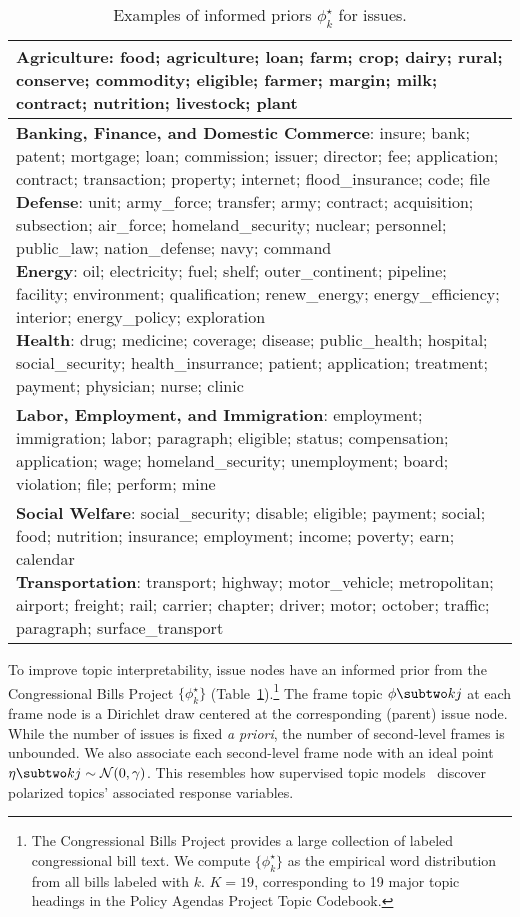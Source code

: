 \begin{table}[t!]
\centering \small
\begin{tabular}{p{.95\linewidth}}
  \hline
  \textbf{{Agriculture}}:
    food; agriculture; loan; farm; crop; dairy; rural; conserve; commodity; eligible; farmer; margin; milk; contract; nutrition; livestock; plant \\ \hline
\ignore{
  \textbf{{Banking, Finance, and Domestic Commerce}}:
    insure; bank; patent; mortgage; loan; commission; issuer; director; fee; application; contract; transaction; property; internet; flood\_insurance; code; file\\ \hline
  \textbf{{Defense}}:
    unit; army\_force; transfer; army; contract; acquisition; subsection; air\_force; homeland\_security; nuclear; personnel; public\_law; nation\_defense; navy; command \\ \hline
  \textbf{{Energy}}:
    oil; electricity; fuel; shelf; outer\_continent; pipeline; facility; environment; qualification; renew\_energy; energy\_efficiency; interior; energy\_policy; exploration \\ \hline}
  \textbf{{Health}}:
    drug; medicine; coverage; disease; public\_health; hospital; social\_security; health\_insurrance; patient; application; treatment; payment; physician; nurse; clinic\\ \hline
  \textbf{{Labor, Employment, and Immigration}}:
    employment; immigration; labor; paragraph; eligible; status; compensation; application; wage; homeland\_security; unemployment; board; violation; file; perform; mine \\ \hline
\ignore{  \textbf{{Social Welfare}}:
    social\_security; disable; eligible; payment; social; food; nutrition; insurance; employment; income; poverty; earn;  calendar \\ \hline
  \textbf{{Transportation}}:
    transport; highway; motor\_vehicle; metropolitan; airport; freight; rail; carrier; chapter; driver; motor; october; traffic; paragraph; surface\_transport \\ \hline}
\end{tabular}
\caption{Examples of informed priors $\phi_k^{\star}$ for issues.}
\label{tab:c6_prior}
\end{table}

To improve topic interpretability, issue nodes have an informed prior
from the Congressional Bills Project $\{\phi_k^{\star}\}$
(Table~\ref{tab:c6_prior}).\footnote{The Congressional Bills Project
  provides a large collection of labeled congressional bill text.  We
  compute $\{\phi_k^{\star}\}$ as the empirical word distribution from
  all bills labeled with $k$. $K=19$, corresponding to 19 major topic
  headings in the Policy Agendas Project Topic Codebook. } The frame
topic $\phi \subtwo kj$ at each frame node is a Dirichlet draw
centered at the corresponding (parent) issue node. While the number of
issues is fixed \textit{a priori}, the number of second-level frames
is unbounded.  We also associate each second-level frame node with an
ideal point $\eta \subtwo kj \sim \mathcal{N}(0, \gamma)$. This
resembles how supervised topic
models~\cite{Blei:NIPS07:slda,Nguyen:NAACL15:anchor}
discover polarized topics' associated response variables.

